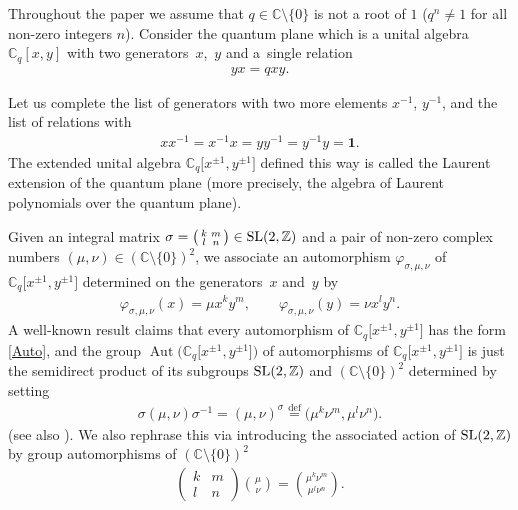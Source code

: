 \documentclass[pdftex]{sigma}
\numberwithin{equation}{section}
\begin{document}
Throughout the paper we assume that $q\in\mathbb{C}{\setminus}\{0\}$ is not a root of $1$ ($q^n\ne 1$ for all non-zero integers $n$). Consider the quantum plane which is a unital algebra $\mathbb{C}_q[x,y]$ with two genera\-tors~$x$,~$y$ and a~single relation
\begin{gather}\label{qpr}
yx=qxy.
\end{gather}

Let us complete the list of generators with two more elements $x^{-1}$, $y^{-1}$, and the list of relations with
\begin{gather}\label{Lpr}
xx^{-1}=x^{-1}x=yy^{-1}=y^{-1}y=\mathbf{1}.
\end{gather}
The extended unital algebra $\mathbb{C}_q\big[x^{\pm 1},y^{\pm 1}\big]$ defined this way is called the Laurent extension of the quantum plane (more precisely, the algebra of Laurent polynomials over the quantum plane).

Given an integral matrix $\sigma=\left(\begin{smallmatrix}k & m\\ l & n\end{smallmatrix}\right)\in {\rm SL}(2,\mathbb{Z})$ and a pair of non-zero complex numbers $(\mu,\nu)\in(\mathbb{C}{\setminus}\{0\})^2$, we associate an automorphism $\varphi_{\sigma,\mu,\nu}$ of $\mathbb{C}_q\big[x^{\pm 1},y^{\pm 1}\big]$ determined on the generators~$x$ and~$y$ by
\begin{gather}\label{Auto}
\varphi_{\sigma,\mu,\nu}(x)=\mu x^ky^m, \qquad \varphi_{\sigma,\mu,\nu}(y)=\nu x^ly^n.
\end{gather}
A well-known result claims that every automorphism of $\mathbb{C}_q\big[x^{\pm 1},y^{\pm 1}\big]$ has the form \eqref{Auto}, and the group $\operatorname{Aut}\big(\mathbb{C}_q\big[x^{\pm 1},y^{\pm 1}\big]\big)$ of automorphisms of $\mathbb{C}_q\big[x^{\pm 1},y^{\pm 1}\big]$ is just the semidirect product of its subgroups ${\rm SL}(2,\mathbb{Z})$ and $(\mathbb{C}{\setminus}\{0\})^2$ determined by setting~\cite{KPS}
\begin{gather*}
\sigma(\mu,\nu)\sigma^{-1}=(\mu,\nu)^\sigma
\stackrel{\operatorname{def}}{=}\big(\mu^k\nu^m,\mu^l\nu^n\big).
\end{gather*}
(see also \cite{AD,PLCCN}). We also rephrase this via introducing the associated action of ${\rm SL}(2,\mathbb{Z})$ by group automorphisms of $(\mathbb{C}{\setminus}\{0\})^2$
\begin{gather}\label{sl_ac}
\begin{pmatrix}k & m\\ l & n\end{pmatrix}\binom{\mu}{\nu}=\binom{\mu^k\nu^m}{\mu^l\nu^n}.
\end{gather}
\end{document}
